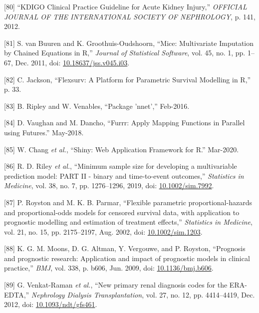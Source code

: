 \documentclass[12pt,PhD,twoside,openright]{muthesis}
\newenvironment{cslreferences}%
  {}%
  {\par}
\begin{document}
\begin{cslreferences}
\leavevmode\hypertarget{ref-noauthor_kdigo_2012}{}%
{[}80{]} ``KDIGO Clinical Practice Guideline for Acute Kidney Injury,'' \emph{OFFICIAL JOURNAL OF THE INTERNATIONAL SOCIETY OF NEPHROLOGY}, p. 141, 2012.

\leavevmode\hypertarget{ref-buuren_mice_2011-1}{}%
{[}81{]} S. van Buuren and K. Groothuis-Oudshoorn, ``Mice: Multivariate Imputation by Chained Equations in R,'' \emph{Journal of Statistical Software}, vol. 45, no. 1, pp. 1--67, Dec. 2011, doi: \href{https://doi.org/10.18637/jss.v045.i03}{10.18637/jss.v045.i03}.

\leavevmode\hypertarget{ref-jackson_flexsurv_nodate}{}%
{[}82{]} C. Jackson, ``Flexsurv: A Platform for Parametric Survival Modelling in R,'' p. 33.

\leavevmode\hypertarget{ref-ripley_package_2016}{}%
{[}83{]} B. Ripley and W. Venables, ``Package 'nnet','' Feb-2016.

\leavevmode\hypertarget{ref-vaughan_furrr_2018}{}%
{[}84{]} D. Vaughan and M. Dancho, ``Furrr: Apply Mapping Functions in Parallel using Futures.'' May-2018.

\leavevmode\hypertarget{ref-chang_shiny_2020}{}%
{[}85{]} W. Chang \emph{et al.}, ``Shiny: Web Application Framework for R.'' Mar-2020.

\leavevmode\hypertarget{ref-riley_minimum_2019}{}%
{[}86{]} R. D. Riley \emph{et al.}, ``Minimum sample size for developing a multivariable prediction model: PART II - binary and time-to-event outcomes,'' \emph{Statistics in Medicine}, vol. 38, no. 7, pp. 1276--1296, 2019, doi: \href{https://doi.org/10.1002/sim.7992}{10.1002/sim.7992}.

\leavevmode\hypertarget{ref-royston_flexible_2002}{}%
{[}87{]} P. Royston and M. K. B. Parmar, ``Flexible parametric proportional-hazards and proportional-odds models for censored survival data, with application to prognostic modelling and estimation of treatment effects,'' \emph{Statistics in Medicine}, vol. 21, no. 15, pp. 2175--2197, Aug. 2002, doi: \href{https://doi.org/10.1002/sim.1203}{10.1002/sim.1203}.

\leavevmode\hypertarget{ref-moons_prognosis_2009-1}{}%
{[}88{]} K. G. M. Moons, D. G. Altman, Y. Vergouwe, and P. Royston, ``Prognosis and prognostic research: Application and impact of prognostic models in clinical practice,'' \emph{BMJ}, vol. 338, p. b606, Jun. 2009, doi: \href{https://doi.org/10.1136/bmj.b606}{10.1136/bmj.b606}.

\leavevmode\hypertarget{ref-venkat-raman_new_2012}{}%
{[}89{]} G. Venkat-Raman \emph{et al.}, ``New primary renal diagnosis codes for the ERA-EDTA,'' \emph{Nephrology Dialysis Transplantation}, vol. 27, no. 12, pp. 4414--4419, Dec. 2012, doi: \href{https://doi.org/10.1093/ndt/gfs461}{10.1093/ndt/gfs461}.


\end{cslreferences}
\end{document}
